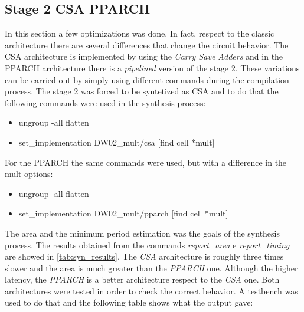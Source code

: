 \subsection{Stage 2 CSA PPARCH}
In this section a few optimizations was done. In fact, respect to the classic architecture there are several differences that change the circuit behavior. The CSA architecture is implemented by using the \textit{Carry Save Adders} and in the PPARCH architecture there is a \textit{pipelined} version of the stage 2. These variations can be carried out by simply using different commands during the compilation process. The stage 2 was forced to be syntetized as CSA and to do that the following commands were used in the synthesis process:
\begin{itemize}
\item ungroup -all flatten
\item set\_implementation DW02\_mult/csa [find cell *mult] 
\end{itemize}
For the PPARCH the same commands were used, but with a difference in the mult options:
\begin{itemize}
\item ungroup -all flatten
\item set\_implementation DW02\_mult/pparch [find cell *mult] 
\end{itemize}
The area and the minimum period estimation was the goals of the synthesis process. The results obtained from the commands \textit{report\_area} e \textit{report\_timing} are showed in \autoref{tab:syn_results}. The \textit{CSA} architecture is roughly three times slower and the area is much greater than the \textit{PPARCH} one. Although the higher latency, the \textit{PPARCH} is a better architecture respect to the \textit{CSA} one.
Both architectures were tested in order to check the correct behavior. A testbench was used to do that and the following table shows what the output gave:

